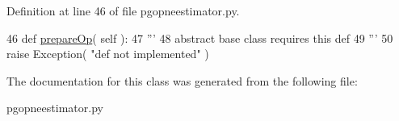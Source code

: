 Definition at line 46 of file pgopneestimator.\+py.


\begin{DoxyCode}
46     \textcolor{keyword}{def }\hyperlink{classnegui_1_1pgopneestimator_1_1PGOpNeEstimator_a37628c8a837a75a542ae82947dc367fd}{prepareOp}( self ):
47         \textcolor{stringliteral}{'''}
48 \textcolor{stringliteral}{        abstract base class requires this def}
49 \textcolor{stringliteral}{        '''}
50         \textcolor{keywordflow}{raise} Exception( \textcolor{stringliteral}{"def not implemented"} )
\end{DoxyCode}


The documentation for this class was generated from the following file\+:\begin{DoxyCompactItemize}
\item 
pgopneestimator.\+py\end{DoxyCompactItemize}
